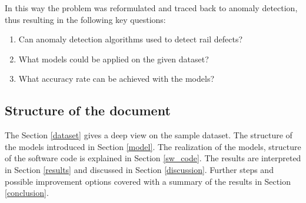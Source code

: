 In this way the problem was reformulated and traced back to anomaly detection, thus resulting in the
following key questions:

\begin{enumerate}[label=Q\arabic*]
    \item \label{itm:Q1} Can anomaly detection algorithms used to detect rail defects?
    \item \label{itm:Q2} What models could be applied on the given dataset?
    \item \label{itm:Q3} What accuracy rate can be achieved with the models?
\end{enumerate}

\subsection{Structure of the document}
The Section \ref{dataset} gives a deep view on the sample dataset.
The structure of the models introduced in Section \ref{model}.
The realization of the models, structure of the software code is explained in Section \ref{sw_code}.
The results are interpreted in Section \ref{results} and discussed in Section \ref{discussion}.
Further steps and possible improvement options covered with a summary of the results in
Section \ref{conclusion}.